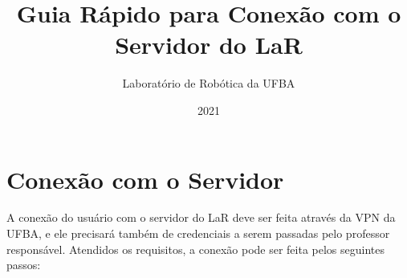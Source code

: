 \documentclass[12pt]{article}
\begin{document}
\title{Guia Rápido para Conexão com o Servidor do LaR}

\author{Laboratório de Robótica da UFBA}

\date{2021}

\maketitle

\setcounter{page}{1} %

\section{Conexão com o Servidor}
A conexão do usuário com o servidor do LaR deve ser feita através da VPN da UFBA, e ele precisará também de credenciais a serem passadas pelo professor responsável.
Atendidos os requisitos, a conexão pode ser feita pelos seguintes passos:
\end{document}
